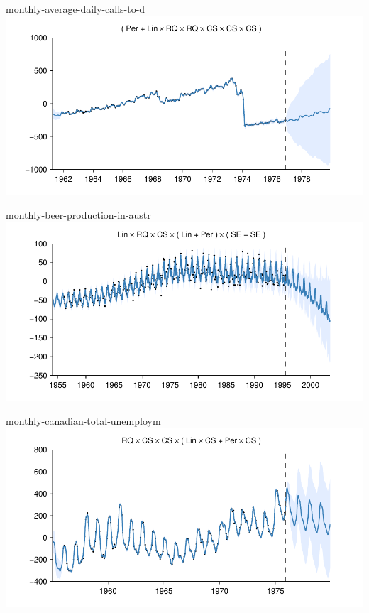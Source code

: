     
\begin{frame}{monthly-average-daily-calls-to-d}
  \center
  \includegraphics[width=1.0\textwidth]{figures/monthly-average-daily-calls-to-d/monthly-average-daily-calls-to-d_all}
\end{frame}  


    
\begin{frame}{monthly-beer-production-in-austr}
  \center
  \includegraphics[width=1.0\textwidth]{figures/monthly-beer-production-in-austr/monthly-beer-production-in-austr_all}
\end{frame}  


    
\begin{frame}{monthly-canadian-total-unemploym}
  \center
  \includegraphics[width=1.0\textwidth]{figures/monthly-canadian-total-unemploym/monthly-canadian-total-unemploym_all}
\end{frame}  


